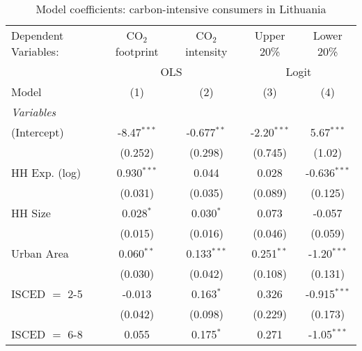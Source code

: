 
\begin{table}[htbp!]
   \centering
   \small
   \begin{adjustbox}{width = 1\textwidth, max height = 0.95\textheight, center}
      \begin{threeparttable}[b]
         \caption{\label{tab:Logit_1_LTU} Model coefficients: carbon-intensive consumers in Lithuania}
         \begin{tabular}{lcccc}
            \tabularnewline \midrule \midrule
            Dependent Variables: & CO$_{2}$ footprint & CO$_{2}$ intensity & Upper 20\%    & Lower 20\%\\   
             & \multicolumn{2}{c}{OLS} & \multicolumn{2}{c}{Logit} \\ 
            Model                & (1)                & (2)                & (3)           & (4)\\  
            \midrule
            \emph{Variables}\\
            (Intercept)          & -8.47$^{***}$      & -0.677$^{**}$      & -2.20$^{***}$ & 5.67$^{***}$\\   
                                 & (0.252)            & (0.298)            & (0.745)       & (1.02)\\   
            HH Exp. (log)        & 0.930$^{***}$      & 0.044              & 0.028         & -0.636$^{***}$\\   
                                 & (0.031)            & (0.035)            & (0.089)       & (0.125)\\   
            HH Size              & 0.028$^{*}$        & 0.030$^{*}$        & 0.073         & -0.057\\   
                                 & (0.015)            & (0.016)            & (0.046)       & (0.059)\\   
            Urban Area           & 0.060$^{**}$       & 0.133$^{***}$      & 0.251$^{**}$  & -1.20$^{***}$\\   
                                 & (0.030)            & (0.042)            & (0.108)       & (0.131)\\   
            ISCED $=$ 2-5        & -0.013             & 0.163$^{*}$        & 0.326         & -0.915$^{***}$\\   
                                 & (0.042)            & (0.098)            & (0.229)       & (0.173)\\   
            ISCED $=$ 6-8        & 0.055              & 0.175$^{*}$        & 0.271         & -1.05$^{***}$\\   

\end{tabular}
\end{threeparttable}
\end{adjustbox}
\end{table}
